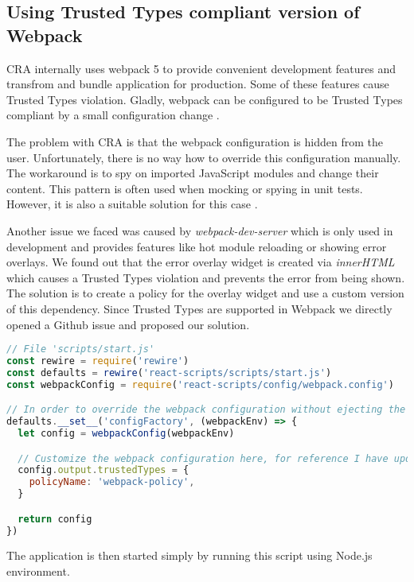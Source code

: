 \subsection{Using Trusted Types compliant version of Webpack}

CRA internally uses webpack 5 to provide convenient development features and transfrom and bundle
application for production. Some of these features cause Trusted Types violation. Gladly, webpack
can be configured to be Trusted Types compliant by a small configuration change
\cite{webpack_tt_config}.

The problem with CRA is that the webpack configuration is hidden from the user. Unfortunately, there
is no way how to override this configuration manually. The workaround is to spy on imported
JavaScript modules and change their content. This pattern is often used when mocking or spying in
unit tests. However, it is also a suitable solution for this case \cite{cra_modify_webpack_config}.

Another issue we faced was caused by \emph{webpack-dev-server} which is only used in development and
provides features like hot module reloading or showing error overlays. We found out that the error
overlay widget is created via \emph{innerHTML} which causes a Trusted Types violation and prevents
the error from being shown. The solution is to create a policy for the overlay widget and use a
custom version of this dependency. Since Trusted Types are supported in Webpack we directly opened a
Github issue \cite{tt_webpack_dev_server:issue} and proposed our solution.

\bigskip
\begin{lstlisting}[language=JavaScript, caption=Script to start React application with Trusted Types enabled in webpack]
// File 'scripts/start.js'
const rewire = require('rewire')
const defaults = rewire('react-scripts/scripts/start.js')
const webpackConfig = require('react-scripts/config/webpack.config')

// In order to override the webpack configuration without ejecting the create-react-app
defaults.__set__('configFactory', (webpackEnv) => {
  let config = webpackConfig(webpackEnv)

  // Customize the webpack configuration here, for reference I have updated webpack externals field
  config.output.trustedTypes = {
    policyName: 'webpack-policy',
  }

  return config
})
\end{lstlisting}

The application is then started simply by running this script using Node.js environment.

